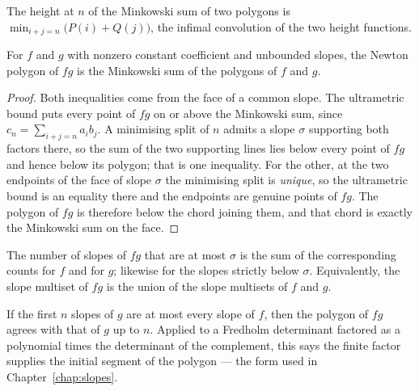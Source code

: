 \begin{definition}
  \label{def:minkowskiheight}
  \leanok
  The height at $n$ of the Minkowski sum of two polygons is
  $\min_{i + j = n}\bigl(P(i) + Q(j)\bigr)$, the infimal convolution of the two height functions.
\end{definition}

\begin{theorem}
  \label{thm:np-product}
  \leanok
  For $f$ and $g$ with nonzero constant coefficient and unbounded slopes, the Newton polygon of
  $fg$ is the Minkowski sum of the polygons of $f$ and $g$.
\end{theorem}

\begin{proof}
  \leanok
  Both inequalities come from the face of a common slope.  The ultrametric bound puts every point
  of $fg$ on or above the Minkowski sum, since $c_n = \sum_{i+j=n} a_i b_j$.  A minimising split
  of $n$ admits a slope $\sigma$ supporting both factors there, so the sum of the two supporting
  lines lies below every point of $fg$ and hence below its polygon; that is one inequality.  For
  the other, at the two endpoints of the face of slope $\sigma$ the minimising split is
  \emph{unique}, so the ultrametric bound is an equality there and the endpoints are genuine
  points of $fg$.  The polygon of $fg$ is therefore below the chord joining them, and that chord
  is exactly the Minkowski sum on the face.
\end{proof}

\begin{corollary}
  \label{cor:np-product-multiplicity}
  \leanok
  The number of slopes of $fg$ that are at most $\sigma$ is the sum of the corresponding counts
  for $f$ and for $g$; likewise for the slopes strictly below $\sigma$.  Equivalently, the slope
  multiset of $fg$ is the union of the slope multisets of $f$ and $g$.
\end{corollary}

\begin{corollary}
  \label{cor:np-product-initial}
  \leanok
  If the first $n$ slopes of $g$ are at most every slope of $f$, then the polygon of $fg$ agrees
  with that of $g$ up to $n$.  Applied to a Fredholm determinant factored as a polynomial times
  the determinant of the complement, this says the finite factor supplies the initial segment of
  the polygon --- the form used in Chapter~\ref{chap:slopes}.
\end{corollary}


